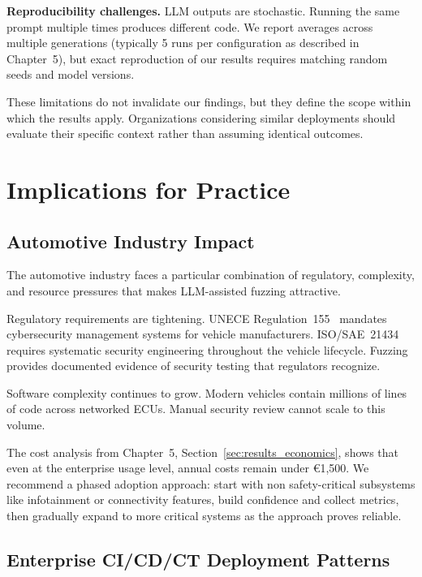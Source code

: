 \textbf{Reproducibility challenges.} LLM outputs are stochastic. Running the same prompt multiple times produces different code. We report averages across multiple generations (typically 5 runs per configuration as described in Chapter~5), but exact reproduction of our results requires matching random seeds and model versions.

These limitations do not invalidate our findings, but they define the scope within which the results apply. Organizations considering similar deployments should evaluate their specific context rather than assuming identical outcomes.


\section{Implications for Practice}
\label{sec:discussion_implications}

\subsection{Automotive Industry Impact}
\label{sec:discussion_automotive}

The automotive industry faces a particular combination of regulatory, complexity, and resource pressures that makes LLM-assisted fuzzing attractive.

Regulatory requirements are tightening. UNECE Regulation~155~\cite{UNECER155} mandates cybersecurity management systems for vehicle manufacturers. ISO/SAE~21434~\cite{ISO21434} requires systematic security engineering throughout the vehicle lifecycle. Fuzzing provides documented evidence of security testing that regulators recognize.

Software complexity continues to grow. Modern vehicles contain millions of lines of code across networked ECUs. Manual security review cannot scale to this volume.

The cost analysis from Chapter~5, Section~\ref{sec:results_economics}, shows that even at the enterprise usage level, annual costs remain under \euro{}1,500. We recommend a phased adoption approach: start with non safety-critical subsystems like infotainment or connectivity features, build confidence and collect metrics, then gradually expand to more critical systems as the approach proves reliable.


\subsection{Enterprise CI/CD/CT Deployment Patterns}
\label{sec:discussion_enterprise_challenges}

